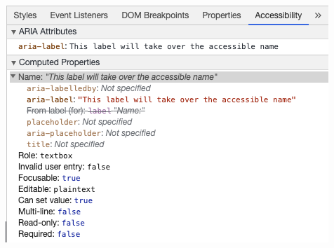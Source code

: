 \begin{center} 
\includegraphics{./img/AccessibleARIAlabelDevTools.2b376a03.png} 
\end{center}
    
 
\begin{paracol}{2} 
 
\end{paracol}


\begin{paracol}{2} 

\end{paracol}



\begin{paracol}{2} 

\end{paracol}



\begin{paracol}{2} 

\end{paracol}



\begin{paracol}{2} 

\end{paracol}


\begin{paracol}{2} 

\end{paracol}



\begin{paracol}{2} 

\end{paracol}



